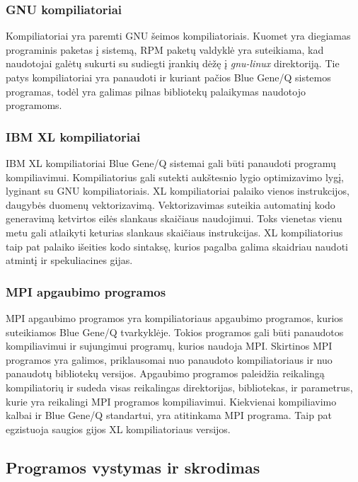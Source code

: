 \subsubsection{GNU kompiliatoriai}

Kompiliatoriai yra paremti GNU šeimos kompiliatoriais.
Kuomet yra diegiamas programinis paketas į sistemą, RPM paketų valdyklė yra suteikiama, kad naudotojai galėtų sukurti su sudiegti įrankių dėžę į \textit{gnu-linux} direktoriją.
Tie patys kompiliatoriai yra panaudoti ir kuriant pačios Blue Gene/Q sistemos programas, todėl yra galimas pilnas bibliotekų palaikymas naudotojo programoms.

\subsubsection{IBM XL kompiliatoriai}

IBM XL kompiliatoriai Blue Gene/Q sistemai gali būti panaudoti programų kompiliavimui.
Kompiliatorius gali sutekti aukštesnio lygio optimizavimo lygį, lyginant su GNU kompiliatoriais.
XL kompiliatoriai palaiko vienos instrukcijos, daugybės duomenų vektorizavimą.
Vektorizavimas suteikia automatinį kodo generavimą ketvirtos eilės slankaus skaičiaus naudojimui.
Toks vienetas vienu metu gali atlaikyti keturias slankaus skaičiaus instrukcijas.
XL kompiliatorius taip pat palaiko išeities kodo sintaksę, kurios pagalba galima skaidriau naudoti atmintį ir spekuliacines gijas.

\subsubsection{MPI apgaubimo programos}

MPI apgaubimo programos yra kompiliatoriaus apgaubimo programos, kurios suteikiamos Blue Gene/Q tvarkyklėje.
Tokios programos gali būti panaudotos kompiliavimui ir sujungimui programų, kurios naudoja MPI.
Skirtinos MPI programos yra galimos, priklausomai nuo panaudoto kompiliatoriaus ir nuo panaudotų bibliotekų versijos.
Apgaubimo programos paleidžia reikalingą kompiliatorių ir sudeda visas reikalingas direktorijas, bibliotekas, ir parametrus, kurie yra reikalingi MPI programos kompiliavimui.
Kiekvienai kompiliavimo kalbai ir Blue Gene/Q standartui, yra atitinkama MPI programa.
Taip pat egzistuoja saugios gijos XL kompiliatoriaus versijos.

\subsection{Programos vystymas ir skrodimas}

